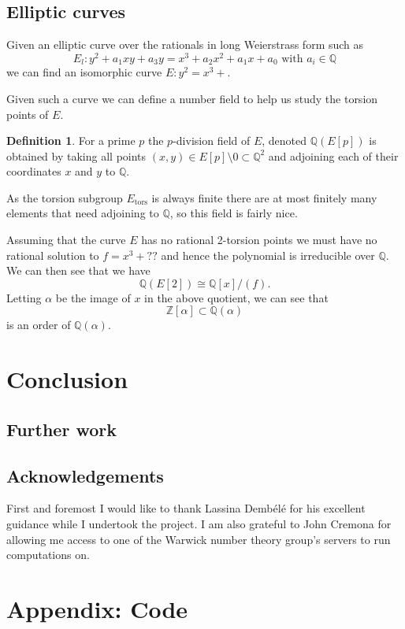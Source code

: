 \documentclass[a4paper,abstracton]{scrreprt}
\theoremstyle{definition}
\newtheorem{defn}{Definition}
\newcommand{\QQ}{\mathbb{Q}}
\newcommand{\ZZ}{\mathbb{Z}}
\begin{document}
\section{Elliptic curves}
\label{sec:ell}
Given an elliptic curve over the rationals in long Weierstrass form such as
\[E_l \colon y^2 + a_1xy + a_3y = x^3 + a_2x^2 + a_1x + a_0\text{ with }a_i \in \QQ\]
we can find an isomorphic curve $E \colon y^2 = x^3 + $.

Given such a curve we can define a number field to help us study the torsion points of $E$.
\begin{defn}
For a prime $p$ the $p$-division field of $E$, denoted $\QQ(E[p])$ is obtained by taking all points $(x,y) \in E[p]\setminus 0\subset \QQ^2$ and adjoining each of their coordinates $x$ and $y$ to $\QQ$.
\end{defn}
As the torsion subgroup $E_\text{tors}$ is always finite there are at most finitely many elements that need adjoining to $\QQ$, so this field is fairly nice.

\minisec{}
Assuming that the curve $E$ has no rational 2-torsion points we must have no rational solution to $f = x^3 + ??$ and hence the polynomial is irreducible over $\QQ$.
We can then see that we have
\[
\QQ(E[2]) \cong \QQ[x]/(f).
\]
Letting $\alpha$ be the image of $x$ in the above quotient, we can see that
\[
\ZZ[\alpha]\subset \QQ(\alpha)
\]
is an order of $\QQ(\alpha)$.



\chapter{Conclusion}


\section{Further work}


\section{Acknowledgements}
First and foremost I would like to thank Lassina Demb\'el\'e for his excellent guidance while I undertook the project.
I am also grateful to John Cremona for allowing me access to one of the Warwick number theory group's servers to run computations on.

\chapter{Appendix: Code}
\end{document}
